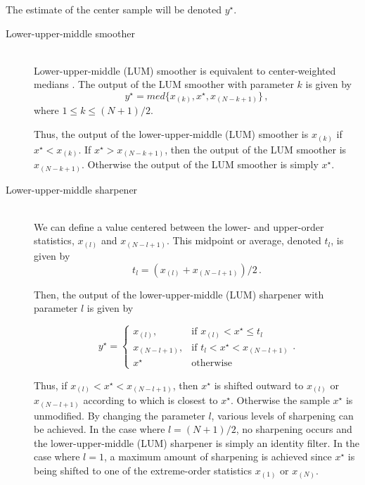 The estimate of the center sample will be denoted $y^{\star}$.

\begin{description} 
      \item[Lower-upper-middle smoother] \ \\
Lower-upper-middle (LUM) smoother is equivalent to 
center-weighted medians \cite[]{Justusson81}. The output of the LUM
smoother with parameter $k$ is given by
\begin{equation}
    y^{\star} = med \{x_{(k)},x^{\star},x_{(N-k+1)}\}\,,
  \label{eq:lumsm} 
\end{equation}
where $1 \le k \le (N+1)/2$.

Thus, the output of the lower-upper-middle (LUM)
smoother is $x_{(k)}$ if $x^{\star} < x_{(k)}$. If $x^{\star} > x_{(N-k+1)}$, then
the output of the LUM smoother is $x_{(N-k+1)}$. Otherwise the output
of the LUM smoother is simply $x^{\star}$.

     \item[Lower-upper-middle sharpener] \ \\
We can define a value centered between the lower- and upper-order
statistics, $x_{(l)}$ and $x_{(N-l+1)}$. This midpoint or average,
denoted $t_l$, is given by
\begin{equation}
   t_l = (x_{(l)}+x_{(N-l+1)})/2\,.
  \label{eq:lumsh1}
\end{equation}

Then, the output of the lower-upper-middle (LUM)
sharpener with parameter $l$ is given by 

\begin{equation}
   y^{\star} = \left\{ \begin{array}{ll} x_{(l)}, &
 \textrm{if $x_{(l)}< x^{\star} \le t_l$}\\ x_{(N-l+1)}, & \textrm{if
 $t_{l}< x^{\star} < x_{(N-l+1)}$}\\ x^{\star} & \textrm{otherwise}
\end{array} \right..
 \label{eq:lumsh2} 
\end{equation}

Thus, if $x_{(l)}<x^{\star}<x_{(N-l+1)}$, then $x^{\star}$ is shifted outward to
$x_{(l)}$ or $x_{(N-l+1)}$ according to which is closest to
$x^{\star}$. Otherwise the sample $x^{\star}$ is unmodified. By changing the
parameter $l$, various levels of sharpening can be achieved.  In the
case where $l=(N+1)/2$, no sharpening occurs and the
lower-upper-middle (LUM) sharpener is simply an
identity filter. In the case where $l=1$, a maximum amount of
sharpening is achieved since $x^{\star}$ is being shifted to one of the
extreme-order statistics $x_{(1)}$ or $x_{(N)}$.


\end{description}
